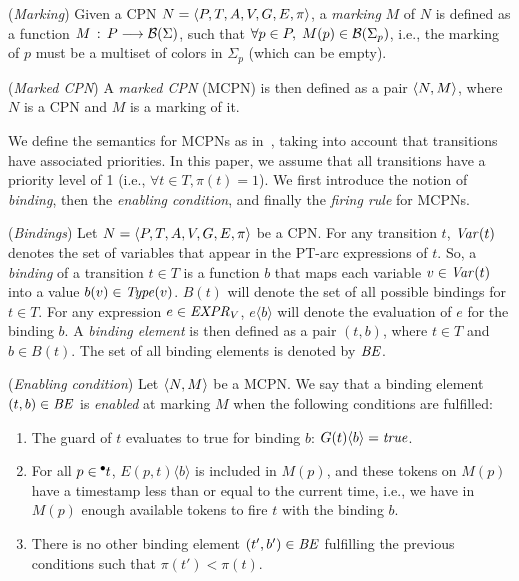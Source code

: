 \begin{definition}({\em Marking}) Given a CPN $N=\langle{P,T,A,V,G,E,\pi}\rangle$, a {\em marking} $M$ of $N$ is defined as a function $M\,:\,P \longrightarrow {\cal B}(\Sigma)$, such that $\forall p \in P, \; M(p) \in {\cal B}(\Sigma_p)$, i.e.,  the marking of $p$ must be a multiset of colors in $\Sigma_p$ (which can be empty). 
\end{definition}

\begin{definition}({\em Marked CPN}) A {\em marked CPN}  (MCPN) is then defined as a pair $\langle{N,M}\rangle$, where $N$ is a CPN and $M$ is a marking of it.
%
\end{definition}

We define the semantics for MCPNs as in~\cite{jensen2009coloured},  taking into account that transitions have associated priorities. In this paper, we assume that all transitions have a priority level of 1 (i.e., $\forall t \in T, \pi(t) = 1$). We first introduce the notion of {\em binding}, then the {\em enabling condition}, and finally the {\em firing rule} for MCPNs.

\begin{definition}({\em Bindings}) Let $N=\langle{P,T,A,V,G,E,\pi}\rangle$ be a CPN.  For any transition $t$, ${\it Var}(t)$ denotes the set of variables that appear in the PT-arc expressions of $t$.%
So, a {\em binding} of a transition $t \in T$ is a function $b$ that maps each variable $v \in {\it Var}(t)$ into a value $b(v) \in {\it Type}(v)$. $B(t)$ will denote the set of all possible bindings for $t \in T$. For any expression $e \in {\it EXPR}_V$, $e\langle b \rangle$ will denote the evaluation of $e$ for the binding $b$.
%
A {\em binding element} is then defined as a pair $(t,b)$, where $t \in T$ and $b \in B(t)$. The set of all binding elements is denoted by ${\it BE}$.
\end{definition}

\begin{definition} \label{permitidas} ({\em Enabling condition}) Let $\langle{N,M}\rangle$ be a MCPN. We say that a binding element $(t,b) \in {\it BE}$ is {\em enabled} at marking $M$ when the following conditions are fulfilled:

\begin{enumerate}
%
	\item The guard of $t$ evaluates to true for binding $b$: $G(t)\langle b \rangle = {\it true}$.
	\item For all $p \in \hspace*{-0.4em}~^{\bullet}\hspace*{-0.05em}t$, $E(p,t)\langle b\rangle$ is included in $M(p)$, and these tokens on $M(p)$ have a timestamp less than or equal to the current time, i.e., we have in $M(p)$ enough available tokens to fire $t$ with the binding $b$.
	\item There is no other binding element $(t',b') \in {\it BE}$ fulfilling the previous conditions such that $\pi(t') < \pi(t)$.
% 
\end{enumerate}

\end{definition}

